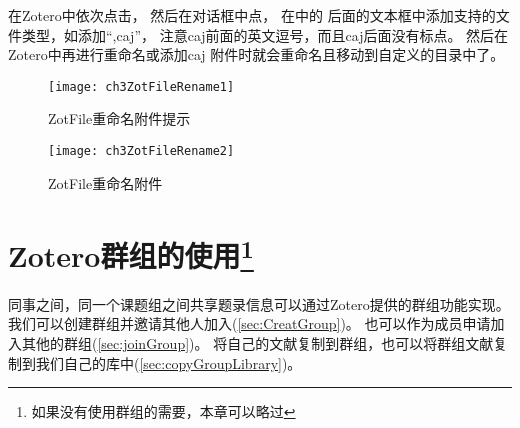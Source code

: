 \documentclass[cn,11pt,chinese]{elegantbook}
\begin{document}
\begin{enumerate}
		\quad \quad 在Zotero中依次点击，
		然后在对话框中点，
		在中的
		后面的文本框中添加支持的文件类型，如添加“,caj”，
		注意caj前面的英文逗号，而且caj后面没有标点。
		然后在Zotero中再进行重命名或添加caj
		附件时就会重命名且移动到自定义的目录中了。

	
			\begin{figure}[htbp]
				\centering
				\texttt{[image: ch3ZotFileRename1]}
				\caption{ZotFile重命名附件提示}
				\label{fig:ch3ZotFileRename1}
			\end{figure}
			\begin{figure}[htbp]
				\centering
				\texttt{[image: ch3ZotFileRename2]}
				\caption{ZotFile重命名附件}
				\label{fig:ch3ZotFileRename2}
			\end{figure}
		\end{enumerate}


  \chapter[Zotero群组的使用]{Zotero群组的使用\footnote{如果没有使用群组的需要，本章可以略过}}\label{ch:group}
	同事之间，同一个课题组之间共享题录信息可以通过Zotero提供的群组功能实现。
	我们可以创建群组并邀请其他人加入(\cref{sec:CreatGroup})。
	也可以作为成员申请加入其他的群组(\cref{sec:joinGroup})。
	将自己的文献复制到群组，也可以将群组文献复制到我们自己的库中(\cref{sec:copyGroupLibrary})。


   
\end{document}
